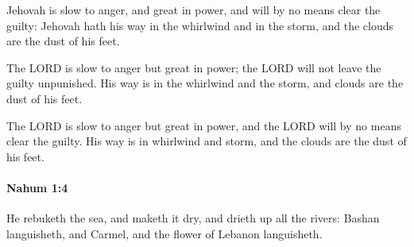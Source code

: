 			\begin{versebox}
					\item[BHS] 
					\item[LXX] 
					\item[ASV] Jehovah is slow to anger, and great in power, and will by no means clear the guilty: Jehovah hath his way in the whirlwind and in the storm, and the clouds are the dust of his feet.
					\item[NIV] The LORD is slow to anger but great in power; the LORD will not leave the guilty unpunished. His way is in the whirlwind and the storm, and clouds are the dust of his feet.
					\item[NRSV] The LORD is slow to anger but great in power, and the LORD will by no means clear the guilty. His way is in whirlwind and storm, and the clouds are the dust of his feet.
			\end{versebox}

		\paragraph{Nahum 1:4} %
			\label{NAHUM-1-4}

			He rebuketh the sea, and maketh it dry, and drieth up all the rivers: Bashan languisheth, and Carmel, and the flower of Lebanon languisheth.

